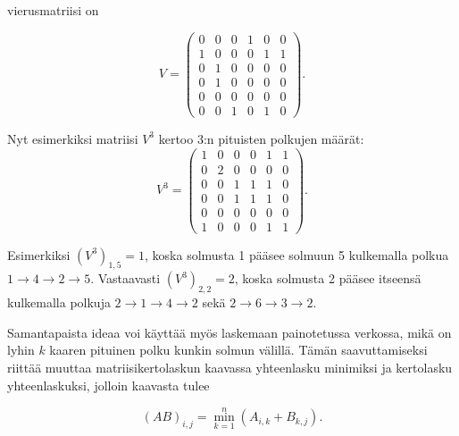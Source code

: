 vierusmatriisi on

\[
V=
\left( \begin{array}{cccccc}
0 & 0 & 0 & 1 & 0 & 0 \\
1 & 0 & 0 & 0 & 1 & 1 \\
0 & 1 & 0 & 0 & 0 & 0 \\
0 & 1 & 0 & 0 & 0 & 0 \\
0 & 0 & 0 & 0 & 0 & 0 \\
0 & 0 & 1 & 0 & 1 & 0 \end{array} \right).
\]

Nyt esimerkiksi matriisi $V^3$ kertoo
3:n pituisten polkujen määrät:
\[
V^3=
\left( \begin{array}{cccccc}
1 & 0 & 0 & 0 & 1 & 1 \\
0 & 2 & 0 & 0 & 0 & 0 \\
0 & 0 & 1 & 1 & 1 & 0 \\
0 & 0 & 1 & 1 & 1 & 0 \\
0 & 0 & 0 & 0 & 0 & 0 \\
1 & 0 & 0 & 0 & 1 & 1 \end{array} \right).
\]

Esimerkiksi $(V^3)_{1,5}=1$,
koska solmusta 1 pääsee solmuun 5
kulkemalla polkua $1 \rightarrow 4 \rightarrow 2 \rightarrow 5$.
Vastaavasti $(V^3)_{2,2}=2$,
koska solmusta 2 pääsee itseensä
kulkemalla polkuja
$2 \rightarrow 1 \rightarrow 4 \rightarrow 2$
sekä $2 \rightarrow 6 \rightarrow 3 \rightarrow 2$.

Samantapaista ideaa voi käyttää myös
laskemaan painotetussa verkossa,
mikä on lyhin $k$ kaaren pituinen polku
kunkin solmun välillä.
Tämän saavuttamiseksi riittää muuttaa matriisikertolaskun
kaavassa yhteenlasku minimiksi
ja kertolasku yhteenlaskuksi,
jolloin kaavasta tulee

\[
(AB)_{i,j} = \min_{k=1}^n (A_{i,k}+B_{k,j}).
\]

